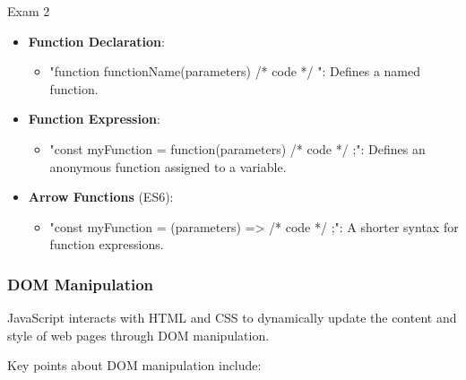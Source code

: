 \begin{examnotes}{Exam 2}
\begin{highlight}[Functions]
        \begin{itemize}
            \item \textbf{Function Declaration}:
                \begin{itemize}
                    \item "function functionName(parameters) { /* code */ }": Defines a named function.
                \end{itemize}
            \item \textbf{Function Expression}:
                \begin{itemize}
                    \item "const myFunction = function(parameters) { /* code */ };": Defines an anonymous function assigned to a variable.
                \end{itemize}
            \item \textbf{Arrow Functions} (ES6):
                \begin{itemize}
                    \item "const myFunction = (parameters) => { /* code */ };": A shorter syntax for function expressions.
                \end{itemize}
        \end{itemize}
    \end{highlight}
    
    \subsubsection*{DOM Manipulation}
    
    JavaScript interacts with HTML and CSS to dynamically update the content and style of web pages through DOM manipulation.
    
    \begin{highlight}
        Key points about DOM manipulation include:
        

\end{highlight}
\end{examnotes}
